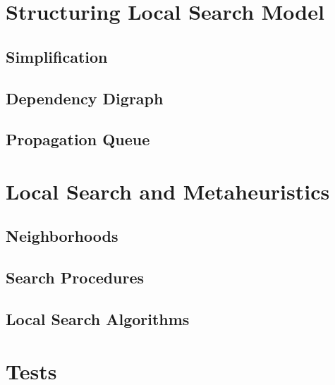 \documentclass[a4paper,11pt]{article}
\begin{document}
\newpage
\section{Structuring Local Search Model} \label{sec_ls}

  \subsection{Simplification}
  
  \subsection{Dependency Digraph}
     \label{sec_ddg}
  \subsection{Propagation Queue}  
    \label{sec_propaqueue}
    
  
\newpage  
%
\section{Local Search and Metaheuristics} \label{sec_local}
  
  \subsection{Neighborhoods}
  
  \subsection{Search Procedures}
  
  \subsection{Local Search Algorithms}
  
  \newpage
\section{Tests}

%


\end{document}
